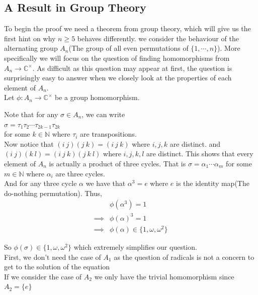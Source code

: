 \subsection{A Result in Group Theory}

To begin the proof we need a theorem from group theory, which will give us the first hint on why $n\geq 5$ behaves differently. we consider the behaviour of the alternating group $A_n$(The group of all even permutations of $\{1,\cdots,n\}$). More specifically we will focus on the question of finding homomorphisms from $A_n\rightarrow\mathbb{C}^{\times}$. As difficult as this question may appear at first, the question is surprisingly easy to answer when we closely look at the properties of each element of $A_n$.\\
Let $\phi:A_n\rightarrow\mathbb{C}^{\times}$ be a group homomorphism.

Note that for any $\sigma\in A_n$, we can write \\
$\sigma=\tau_1\tau_2\cdots\tau_{2k-1}\tau_{2k}$ \\
for some $k\in\mathbb{N}$ where $\tau_i$ are transpositions.\\

Now notice that $(i\ j)(j\ k)=(i\ j\ k)$ where $i,j,k$ are distinct. and $(i\ j)(k\ l)=(i\ j\ k)(j\ k\ l)$ where $i,j,k,l$ are distinct. This shows that every element of $A_n$ is actually a product of three cycles. That is $\sigma=\alpha_1\cdots\alpha_m$ for some $m\in\mathbb{N}$ where $\alpha_i$ are three cycles.\\

And for any three cycle $\alpha$ we have that $\alpha^3=e$ where $e$ is the identity map(The do-nothing permutation). Thus,
\begin{align*}
&\phi(\alpha^3)=1\\
\implies&\phi(\alpha)^3=1\\
\implies&\phi(\alpha)\in\{1,\omega,\omega^2\}
\end{align*}

So $\phi(\sigma)\in\{1,\omega,\omega^2\}$ which extremely simplifies our question.\\

First, we don't need the case of $A_1$ as the question of radicals is not a concern to get to the solution of the equation\\

If we consider the case of $A_2$ we only have the trivial homomorphism since $A_2=\{e\}$\\ 

